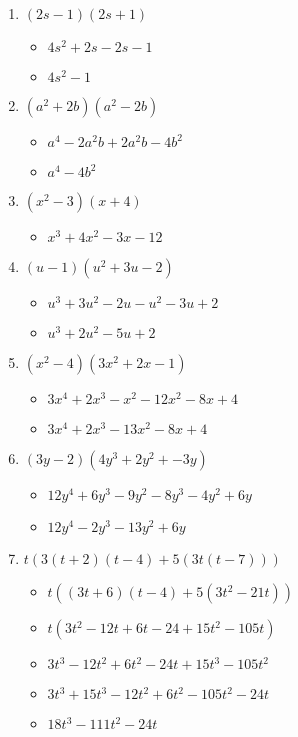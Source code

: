 \documentclass{article}
\begin{document}
\begin{onehalfspace}
\begin{enumerate}
    \item $(2s - 1)(2s + 1)$
    \begin{itemize}
        \item $4s^{2} + 2s - 2s - 1$
        \item $4s^{2} - 1$
    \end{itemize}

    \item $(a^{2} + 2b)(a^{2} - 2b)$
    \begin{itemize}
        \item $a^{4} - 2a^{2}b + 2a^{2}b - 4b^{2}$
        \item $a^{4} - 4b^{2}$
    \end{itemize}

    \item $(x^{2} - 3)(x + 4)$
    \begin{itemize}
        \item $x^{3} + 4x^{2} - 3x - 12$
    \end{itemize}

    \item $(u - 1)(u^{2} + 3u - 2)$
    \begin{itemize}
        \item $u^{3} + 3u^{2} - 2u - u^{2} - 3u + 2$
        \item $u^{3} + 2u^{2} - 5u + 2$
    \end{itemize}

    \item $(x^{2} - 4)(3x^{2} + 2x - 1)$
    \begin{itemize}
        \item $3x^{4} + 2x^{3} - x^{2} - 12x^{2} - 8x + 4$
        \item $3x^{4} + 2x^{3} - 13x^{2} - 8x + 4$
    \end{itemize}

    \item $(3y - 2)(4y^{3} + 2y^{2} + -3y)$
    \begin{itemize}
        \item $12y^{4} + 6y^{3} - 9y^{2} - 8y^{3} - 4y^{2} + 6y$
        \item $12y^{4} - 2y^{3} - 13y^{2} + 6y$
    \end{itemize}

    \item $t(3(t + 2)(t - 4) + 5(3t(t - 7)))$
    \begin{itemize}
        \item $t((3t + 6)(t - 4) + 5(3t^{2} - 21t))$
        \item $t(3t^{2} - 12t + 6t - 24 + 15t^{2} - 105t)$
        \item $3t^{3} - 12t^{2} + 6t^{2} - 24t + 15t^{3} - 105t^{2}$
        \item $3t^{3} + 15t^{3} - 12t^{2} + 6t^{2} - 105t^{2} - 24t$
        \item $18t^{3} - 111t^{2} - 24t$
    \end{itemize}


\end{enumerate}
\end{onehalfspace}
\end{document}
